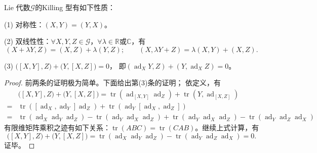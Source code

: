 \begin{theorem}\label{chlg:thm_Killing-sym}
     Lie 代数$\mathscr{G}$的Killing 型有如下性质：

    (1) 对称性：$(X,Y)=(Y,X)$。

    (2) 双线性性：$\forall X,Y,Z\in \mathscr{G}$，$\forall \lambda \in \mathbb{R}$或$\mathbb{C}$，有
    \begin{equation*}
        (X+ \lambda Y ,Z)= (X,Z)+ \lambda (Y,Z); \qquad
        (X, \lambda Y +Z ) =  \lambda (X,Y)+ (X,Z).
    \end{equation*}

    (3) $\bigl([X,Y], Z\bigr)+ \bigl(Y, [X,Z]\bigr)=0$，
    即$(\operatorname{ad}_X Y, Z)+ (Y, \operatorname{ad}_X Z)=0$。
\end{theorem}
\begin{proof}
    前两条的证明极为简单。下面给出第(3)条的证明；    依定义，有
    \begin{align*}
        &\bigl([X,Y], Z\bigr) + \bigl(Y, [X,Z]\bigr)
        =  \operatorname{tr} (\operatorname{ad}_{[X,Y]}  \operatorname{ad}_Z) + \operatorname{tr} (Y, \operatorname{ad}_{[X,Z]}) \\
        =& \operatorname{tr} ([\operatorname{ad}_{X}, \operatorname{ad}_{Y}]  \operatorname{ad}_Z)
          +\operatorname{tr} (\operatorname{ad}_Y [\operatorname{ad}_{X}, \operatorname{ad}_{Z}]  ) \\
        =& \operatorname{tr} (\operatorname{ad}_{X} \operatorname{ad}_{Y}  \operatorname{ad}_Z) -\operatorname{tr} ( \operatorname{ad}_{Y} \operatorname{ad}_{X}  \operatorname{ad}_Z)
          +\operatorname{tr} (\operatorname{ad}_Y \operatorname{ad}_{X} \operatorname{ad}_{Z} ) -\operatorname{tr} (\operatorname{ad}_Y \operatorname{ad}_{Z} \operatorname{ad}_{X}  )
    \end{align*}
    有限维矩阵乘积之迹有如下关系：$\operatorname{tr}(ABC)=\operatorname{tr}(CAB)$。继续上式计算，有
    \begin{equation*}
        \bigl([X,Y], Z\bigr) + \bigl(Y, [X,Z]\bigr)
        =\operatorname{tr} (\operatorname{ad}_{X} \operatorname{ad}_{Y}  \operatorname{ad}_Z)  -\operatorname{tr} (\operatorname{ad}_Y \operatorname{ad}_{Z} \operatorname{ad}_{X}  )
        =0 .
    \end{equation*}
    证毕。
\end{proof}

